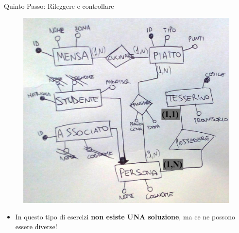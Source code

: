 \begin{frame}{Quinto Passo: Rileggere e controllare}
\begin{minipage}[t]{0.6\linewidth}
\vspace{-1cm}
    \begin{figure}
        \centering
        \includegraphics[width=.9\textwidth]{img/er-dopo-quinto-passo.png}
    \end{figure}
\end{minipage}%
\hfill%
\begin{minipage}[t]{0.35\linewidth}
\vspace{.3cm}
\begin{itemize}[<+->]
    \item In questo tipo di esercizi \textbf{non esiste UNA soluzione}, ma ce ne possono essere diverse!
\end{itemize}
\end{minipage}
\end{frame}
%